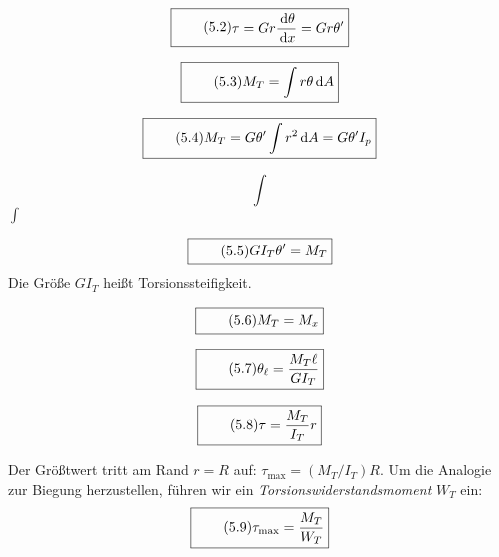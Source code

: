 \documentclass[11pt]{article}
\newcommand{\1}{ {\mathds{1}} }
\newcommand{\td}{\,\text{d}}
\begin{document}
\begin{multicols}{2}
		\begin{equation}
			\boxed{
				\tag{5.2}
				\begin{split}
					\tau = G r \frac{\td \theta}{\td x} = G r \theta'
				\end{split}
			}
		\end{equation}

		\begin{equation}
			\boxed{
				\tag{5.3}
				\begin{split}
					M_T = \int r\theta \td A
				\end{split}
			}
		\end{equation}

		\begin{equation}
			\boxed{
				\tag{5.4}
				\begin{split}
					M_T = G\theta' \displaystyle\int r^2 \td A = G \theta' I_p
				\end{split}
			}
		\end{equation}
		
		\[\int\]
		$\int $
		
		\begin{equation}
			\boxed{
				\tag{5.5}
				\begin{split}
					GI_T \theta' = M_T
				\end{split}
			}
		\end{equation}
		Die Größe $GI_T$ heißt Torsionssteifigkeit.

		\begin{equation}
			\boxed{
				\tag{5.6}
				\begin{split}
					M_T = M_x
				\end{split}
			}
		\end{equation}

		\begin{equation}
			\boxed{
				\tag{5.7}
				\begin{split}
					\theta_{\ell} = \frac{M_T \ell}{GI_T}
				\end{split}
			}
		\end{equation}

		\begin{equation}
			\boxed{
				\tag{5.8}
				\begin{split}
					\tau = \frac{M_T}{I_T}r
				\end{split}
			}
		\end{equation}
		
		\pagebreak[0]
		Der Größtwert tritt am Rand $ r = R $ auf: $ \tau_{\text{max}} = \left( M_T / I_T \right) R $.
		Um
die Analogie zur Biegung herzustellen, führen wir ein \textit{Torsionswiderstandsmoment} $ W_T $ ein:
		\nopagebreak
		\begin{equation}
			\boxed{
				\tag{5.9}
				\begin{split}
					\tau_{\text{max}} = \frac{M_T}{W_T}
				\end{split}
			}
		\end{equation}


\end{multicols}
\end{document}
